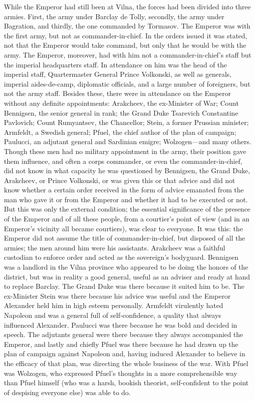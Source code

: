 While the Emperor had still been at Vilna, the forces had been
divided into three armies. First, the army under Barclay de
Tolly, secondly, the army under Bagration, and thirdly, the one
commanded by Tormasov. The Emperor was with the first army, but
not as commander-in-chief. In the orders issued it was stated,
not that the Emperor would take command, but only that he would
be with the army. The Emperor, moreover, had with him not a
commander-in-chief's staff but the imperial headquarters
staff. In attendance on him was the head of the imperial staff,
Quartermaster General Prince Volkonski, as well as generals,
imperial aides-de-camp, diplomatic officials, and a large number
of foreigners, but not the army staff. Besides these, there were
in attendance on the Emperor without any definite appointments:
Arakcheev, the ex-Minister of War; Count Bennigsen, the senior
general in rank; the Grand Duke Tsarevich Constantine Pavlovich;
Count Rumyantsev, the Chancellor; Stein, a former Prussian
minister; Armfeldt, a Swedish general; Pfuel, the chief author of
the plan of campaign; Paulucci, an adjutant general and Sardinian
emigre; Wolzogen---and many others. Though these men had no
military appointment in the army, their position gave them
influence, and often a corps commander, or even the
commander-in-chief, did not know in what capacity he was
questioned by Bennigsen, the Grand Duke, Arakcheev, or Prince
Volkonski, or was given this or that advice and did not know
whether a certain order received in the form of advice emanated
from the man who gave it or from the Emperor and whether it had
to be executed or not. But this was only the external condition;
the essential significance of the presence of the Emperor and of
all these people, from a courtier's point of view (and in an
Emperor's vicinity all became courtiers), was clear to
everyone. It was this: the Emperor did not assume the title of
commander-in-chief, but disposed of all the armies; the men
around him were his assistants. Arakcheev was a faithful
custodian to enforce order and acted as the sovereign's
bodyguard.  Bennigsen was a landlord in the Vilna province who
appeared to be doing the honors of the district, but was in
reality a good general, useful as an adviser and ready at hand to
replace Barclay. The Grand Duke was there because it suited him
to be. The ex-Minister Stein was there because his advice was
useful and the Emperor Alexander held him in high esteem
personally. Armfeldt virulently hated Napoleon and was a general
full of self-confidence, a quality that always influenced
Alexander.  Paulucci was there because he was bold and decided in
speech. The adjutants general were there because they always
accompanied the Emperor, and lastly and chiefly Pfuel was there
because he had drawn up the plan of campaign against Napoleon
and, having induced Alexander to believe in the efficacy of that
plan, was directing the whole business of the war. With Pfuel was
Wolzogen, who expressed Pfuel's thoughts in a more comprehensible
way than Pfuel himself (who was a harsh, bookish theorist,
self-confident to the point of despising everyone else) was able
to do.

